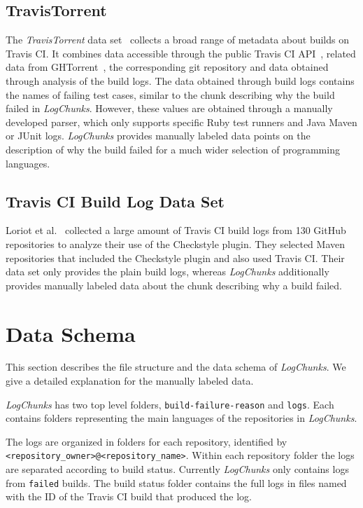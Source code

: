 \documentclass[\myrootdir/main.tex]{subfiles}
\begin{document}
\subsection{TravisTorrent}
The \emph{TravisTorrent} data set~\cite{beller2017travistorrent} collects a broad range of metadata about builds on Travis CI\@.
It combines data accessible through the public Travis CI API~\cite{travisci2019apidoc}, related data from GHTorrent~\cite{gousios2013ghtorrent}, the corresponding git repository and data obtained through analysis of the build logs.
The data obtained through build logs contains the names of failing test cases, similar to the chunk describing why the build failed in \emph{LogChunks}.
However, these values are obtained through a manually developed parser, which only supports specific Ruby test runners and Java Maven or JUnit logs.
\emph{LogChunks} provides manually labeled data points on the description of why the build failed for a much wider selection of programming languages.

\subsection{Travis CI Build Log Data Set}
Loriot et al.~\cite{loriot2019dataset, loriot2019styler} collected a large amount of Travis CI build logs from 130 GitHub repositories to analyze their use of the Checkstyle plugin.
They selected Maven repositories that included the Checkstyle plugin and also used Travis CI\@.
Their data set only provides the plain build logs, whereas \emph{LogChunks} additionally provides manually labeled data about the chunk describing why a build failed.

\section{Data Schema}
\label{sec:data-schema}
This section describes the file structure and the data schema of \emph{LogChunks}.
We give a detailed explanation for the manually labeled data.

\emph{LogChunks} has two top level folders, \texttt{build-failure-reason} and \texttt{logs}.
Each contains folders representing the main languages of the repositories in \emph{LogChunks}.

The logs are organized in folders for each repository, identified by \texttt{\textless repository\_owner\textgreater @\textless repository\_name\textgreater }.
Within each repository folder the logs are separated according to build status.
Currently \emph{LogChunks} only contains logs from \texttt{failed} builds.
The build status folder contains the full logs in files named with the ID of the Travis CI build that produced the log.
\end{document}
